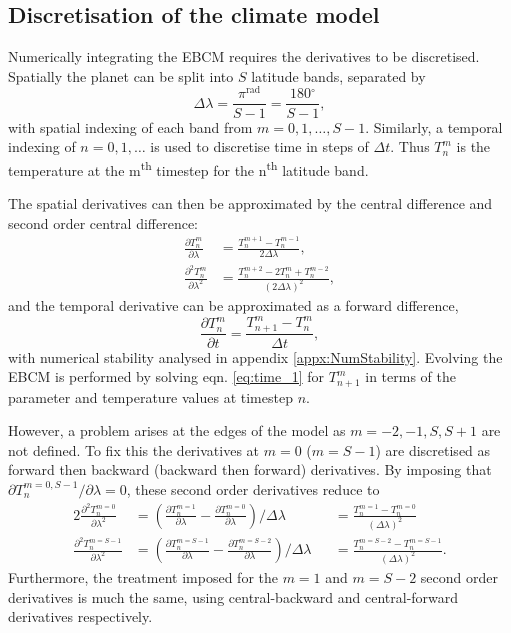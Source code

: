 \documentclass[12pt, onecolumn]{revtex4-2}    %
\newcommand{\radians}{\ensuremath{^{\text{rad}}}}
\newcommand{\degrees}{\ensuremath{^{\circ}}}
\newcommand{\partialderiv}[2]{\frac{\partial {#1}}{\partial {#2}}}
\newcommand{\partialderivsecnd}[2]{\frac{\partial^2 {#1}}{\partial {#2}^2}}
\begin{document}
\subsection{Discretisation of the climate model} \label{ssec:DiscretisationPDE}
Numerically integrating the EBCM requires the derivatives to be discretised.
Spatially the planet can be split into $S$ latitude bands, separated by
\begin{equation}
  \Delta\lambda = \frac{\pi\radians}{S-1} = \frac{180\degrees}{S-1},
\end{equation}
with spatial indexing of each band from $m=0, 1, \dots, S-1$.
Similarly, a temporal indexing of $n=0, 1, \dots$ is used to discretise time in steps of $\Delta t$.
Thus $T^m_n$ is the temperature at the m\textsuperscript{th} timestep for the n\textsuperscript{th} latitude band.

The spatial derivatives can then be approximated by the central difference and second order central difference:
\begin{align}
  \partialderiv{T^m_n}{\lambda}      & = \frac{T^{m+1}_n - T^{m-1}_n}{2 \Delta\lambda},     \label{eq:space_1}        \\
  \partialderivsecnd{T^m_n}{\lambda} & = \frac{T^{m+2}_n -2T^m_n + T^{m-2}_n}{(2 \Delta\lambda)^2},\label{eq:space_2}
\end{align}
and the temporal derivative can be approximated as a forward difference,
\begin{equation}
  \partialderiv{T^m_n}{t} = \frac{T^m_{n+1} - T^m_n}{\Delta t},\label{eq:time_1}
\end{equation}
with numerical stability analysed in appendix \ref{appx:NumStability}.
Evolving the EBCM is performed by solving eqn. \eqref{eq:time_1} for $T^m_{n+1}$ in terms of the parameter and temperature values at timestep $n$.

However, a problem arises at the edges of the model as $m=-2, -1, S, S+1$ are not defined.
To fix this the derivatives at $m=0$ ($m=S-1$) are discretised as forward then backward (backward then forward) derivatives.
By imposing that ${\partial T^{m=0, S-1}_n}/{\partial \lambda} = 0$, these second order derivatives reduce to
\begin{alignat}{2}
  \partialderivsecnd{T^{m=0}_n}{\lambda}   & = \left(\partialderiv{T^{m=1}_n}{\lambda} - \partialderiv{T^{m=0}_n}{\lambda}\right) / \Delta\lambda     &  & = \frac{T^{m=1}_n - T^{m=0}_n}{(\Delta\lambda)^2}
  \label{eq:forward_backward}                                                                                                                                                                                     \\
  \partialderivsecnd{T^{m=S-1}_n}{\lambda} & = \left(\partialderiv{T^{m=S-1}_n}{\lambda} - \partialderiv{T^{m=S-2}_n}{\lambda}\right) / \Delta\lambda &  & = \frac{T^{m=S-2}_n - T^{m=S-1}_n}{(\Delta\lambda)^2}.
  \label{eq:backward_forward}
\end{alignat}
Furthermore, the treatment imposed for the $m=1$ and $m=S-2$ second order derivatives is much the same, using central-backward and central-forward derivatives respectively.
\end{document}
